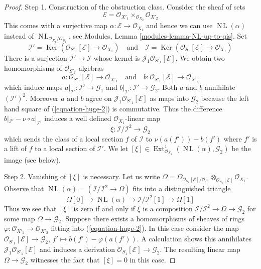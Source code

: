\documentclass{stacks-project}
\theoremstyle{plain}
\theoremstyle{definition}
\theoremstyle{remark}
\numberwithin{equation}{subsection}
\def\Ext{\mathop{\mathrm{Ext}}\nolimits}
\def\NL{\mathop{N\!L}\nolimits}
\def\Ker{\mathop{\mathrm{Ker}}}
\begin{document}
\begin{proof}
\medskip\noindent
Step 1. Construction of the obstruction class. Consider the sheaf
of sets
$$
\mathcal{E} = \mathcal{O}_{X'_1} \times_{\mathcal{O}_{X_2}} \mathcal{O}_{X'_2}
$$
This comes with a surjective map $\alpha : \mathcal{E} \to \mathcal{O}_{X_1}$
and hence we can use $\NL(\alpha)$ instead of
$\NL_{\mathcal{O}_{X_1}/\mathcal{O}_{S_1}}$, see
Modules, Lemma \ref{modules-lemma-NL-up-to-qis}.
Set
$$
\mathcal{I}' =
\Ker(\mathcal{O}_{S'_1}[\mathcal{E}] \to \mathcal{O}_{X_1})
\quad\text{and}\quad
\mathcal{I} =
\Ker(\mathcal{O}_{S_1}[\mathcal{E}] \to \mathcal{O}_{X_1})
$$
There is a surjection $\mathcal{I}' \to \mathcal{I}$ whose kernel
is $\mathcal{J}_1\mathcal{O}_{S'_1}[\mathcal{E}]$.
We obtain two homomorphisms of $\mathcal{O}_{S'_1}$-algebras
$$
a : \mathcal{O}_{S'_1}[\mathcal{E}] \to \mathcal{O}_{X'_1}
\quad\text{and}\quad
b : \mathcal{O}_{S'_1}[\mathcal{E}] \to \mathcal{O}_{X'_2}
$$
which induce maps $a|_{\mathcal{I}'} : \mathcal{I}' \to \mathcal{G}_1$ and
$b|_{\mathcal{I}'} : \mathcal{I}' \to \mathcal{G}_2$. Both $a$ and $b$
annihilate $(\mathcal{I}')^2$. Moreover $a$ and $b$ agree on
$\mathcal{J}_1\mathcal{O}_{S'_1}[\mathcal{E}]$ as maps into $\mathcal{G}_2$
because the left hand square of (\ref{equation-huge-2}) is commutative.
Thus the difference
$b|_{\mathcal{I}'} - \nu \circ a|_{\mathcal{I}'}$
induces a well defined $\mathcal{O}_{X_1}$-linear map
$$
\xi : \mathcal{I}/\mathcal{I}^2 \longrightarrow \mathcal{G}_2
$$
which sends the class of a local section $f$ of $\mathcal{I}$ to
$\nu(a(f')) - b(f')$ where $f'$ is a lift of $f$ to a local
section of $\mathcal{I}'$. We let
$[\xi] \in \Ext^1_{\mathcal{O}_{X_1}}(\NL(\alpha), \mathcal{G}_2)$
be the image (see below).

\medskip\noindent
Step 2. Vanishing of $[\xi]$ is necessary. Let us write
$\Omega = \Omega_{\mathcal{O}_{S_1}[\mathcal{E}]/\mathcal{O}_{S_1}}
\otimes_{\mathcal{O}_{S_1}[\mathcal{E}]} \mathcal{O}_{X_1}$.
Observe that $\NL(\alpha) = (\mathcal{I}/\mathcal{I}^2 \to \Omega)$
fits into a distinguished triangle
$$
\Omega[0] \to
\NL(\alpha) \to
\mathcal{I}/\mathcal{I}^2[1] \to
\Omega[1]
$$
Thus we see that $[\xi]$ is zero if and only if $\xi$
is a composition $\mathcal{I}/\mathcal{I}^2 \to \Omega \to \mathcal{G}_2$
for some map $\Omega \to \mathcal{G}_2$. Suppose there exists a
homomorphisms of sheaves of rings
$\varphi : \mathcal{O}_{X'_1} \to \mathcal{O}_{X'_2}$ fitting into
(\ref{equation-huge-2}). In this case consider the map
$\mathcal{O}_{S'_1}[\mathcal{E}] \to \mathcal{G}_2$,
$f' \mapsto b(f') - \varphi(a(f'))$. A calculation
shows this annihilates $\mathcal{J}_1\mathcal{O}_{S'_1}[\mathcal{E}]$
and induces a derivation $\mathcal{O}_{S_1}[\mathcal{E}] \to \mathcal{G}_2$.
The resulting linear map $\Omega \to \mathcal{G}_2$ witnesses the
fact that $[\xi] = 0$ in this case.


\end{proof}
\end{document}
